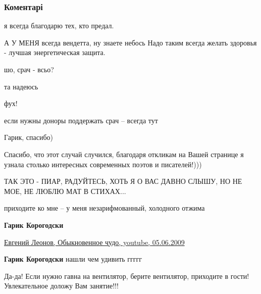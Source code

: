  
 
 
 
 
\subsubsection{Коментарі}

\begin{itemize} %
я всегда благодарю тех, кто предал.

А У МЕНЯ всегда вендетта, ну знаете небось
Надо таким всегда желать здоровья - лучшая энергетическая защита.


шо, срач - всьо?

та надеюсь


фух!


если нужны доноры поддержать срач – всегда тут

Гарик, спасибо)

Спасибо, что этот случай случился, благодаря откликам на Вашей странице я узнала столько интересных современных поэтов и писателей!)))

ТАК ЭТО - ПИАР, РАДУЙТЕСЬ, ХОТЬ Я О ВАС ДАВНО СЛЫШУ, НО НЕ МОЕ, НЕ ЛЮБЛЮ МАТ В СТИХАХ...

\begin{itemize} %

приходите ко мне – у меня незарифмованный, холодного отжима

\textbf{Гарик Корогодски} 

\href{https://www.youtube.com/watch?v=ltEwy-QdxJE}{%
Евгений Леонов, Обыкновенное чудо, youtube, 05.06.2009%
}

\textbf{Гарик Корогодски} нашли чем удивить ггггг


\end{itemize} %

Да-да! Если нужно гавна на вентилятор, берите вентилятор, приходите в гости! Увлекательное доложу Вам занятие!!!


\end{itemize}
